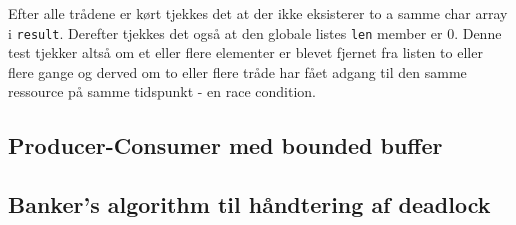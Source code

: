 Efter alle trådene er kørt tjekkes det at der ikke eksisterer to a samme char array i \texttt{result}. Derefter tjekkes det også at den globale listes \texttt{len} member er 0. Denne test tjekker altså om et eller flere elementer er blevet fjernet fra listen to eller flere gange og derved om to eller flere tråde har fået adgang til den samme ressource på samme tidspunkt - en race condition.

\subsection{Producer-Consumer med bounded buffer}

\subsection{Banker's algorithm til håndtering af deadlock}
